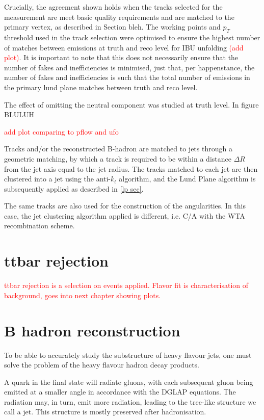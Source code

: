 \documentclass[10pt,a4paper]{book}
\newcommand{\todo}[1]{{\textcolor{red}{#1}}}
\begin{document}
Crucially, the agreement shown holds when the tracks selected for the measurement are meet basic quality requirements and are matched to the primary vertex, as described in Section bleh. The working points and $p_T$ threshold used in the track selection were optimised to ensure the highest number of matches between emissions at truth and reco level for IBU unfolding \todo{(add plot)}. It is important to note that this does not necessarily ensure that the number of fakes and inefficiencies is minimised, just that, per happenstance, the number of fakes and inefficiencies is such that the total number of emissions in the primary lund plane matches between truth and reco level.

The effect of omitting the neutral component was studied at truth level. In figure BLULUH 

\todo{add plot comparing to pflow and ufo}

Tracks and/or the reconstructed B-hadron are matched to jets through a geometric matching, by which a track is required to be within a distance $\Delta R$ from the jet axis equal to the jet radius. The tracks matched to each jet are then clustered into a jet using the anti-$k_t$ algorithm, and the Lund Plane algorithm is subsequently applied as described in \ref{lp sec}.

The same tracks are also used for the construction of the angularities. In this case, the jet clustering algorithm applied is different, i.e. C/A with the WTA recombination scheme. 

\section{ttbar rejection}
\todo{ttbar rejection is a selection on events applied. Flavor fit is characterisation of background, goes into next chapter showing plots.}



\section{B hadron reconstruction}
To be able to accurately study the substructure of heavy flavour jets, one must solve the problem of the heavy flavour hadron decay products. 

A quark in the final state will radiate gluons, with each subsequent gluon being emitted at a smaller angle in accordance with the DGLAP equations. The radiation may, in turn, emit more radiation, leading to the tree-like structure we call a jet. This structure is mostly preserved after hadronisation.
\end{document}
